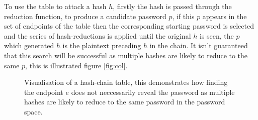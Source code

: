\documentclass[a4paper,12pt]{article}
\begin{document}
To use the table to attack a hash $h$, firstly the hash is passed through the reduction function, to produce a candidate password $p$, if this $p$ appears in the set of endpoints of the table then the corresponding starting password is selected and the series of hash-reductions is applied until the original $h$ is seen, the $p$ which generated $h$ is the plaintext preceding $h$ in the chain. 
It isn't guaranteed that this search will be successful as multiple hashes are likely to reduce to the same $p$, this is illustrated figure \ref{fig:col}.
\begin{figure}
    \begin{center}
\end{center}
\caption{Visualisation of a hash-chain table, this demonstrates how finding the endpoint $e$ does not neccessarily reveal the password as multiple hashes are likely to reduce to the same password in the password space.}
\label{fig:table}
\end{figure}
\end{document}
